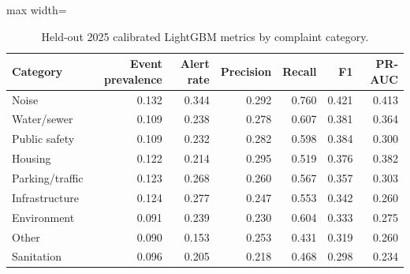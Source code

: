 \begin{table}[t]
\caption{Held-out 2025 calibrated LightGBM metrics by complaint category.}\label{tab:category_performance}
\centering
\begin{adjustbox}{max width=\textwidth}
\begin{tabular}{@{}lrrrrrr@{}}
\toprule
Category & Event prevalence & Alert rate & Precision & Recall & F1 & PR-AUC \\
\midrule
Noise & 0.132 & 0.344 & 0.292 & 0.760 & 0.421 & 0.413 \\
Water/sewer & 0.109 & 0.238 & 0.278 & 0.607 & 0.381 & 0.364 \\
Public safety & 0.109 & 0.232 & 0.282 & 0.598 & 0.384 & 0.300 \\
Housing & 0.122 & 0.214 & 0.295 & 0.519 & 0.376 & 0.382 \\
Parking/traffic & 0.123 & 0.268 & 0.260 & 0.567 & 0.357 & 0.303 \\
Infrastructure & 0.124 & 0.277 & 0.247 & 0.553 & 0.342 & 0.260 \\
Environment & 0.091 & 0.239 & 0.230 & 0.604 & 0.333 & 0.275 \\
Other & 0.090 & 0.153 & 0.253 & 0.431 & 0.319 & 0.260 \\
Sanitation & 0.096 & 0.205 & 0.218 & 0.468 & 0.298 & 0.234 \\
\bottomrule
\end{tabular}
\end{adjustbox}
\end{table}
